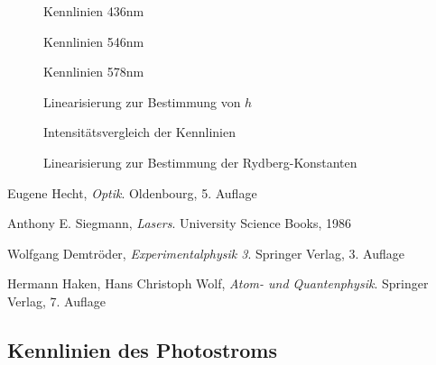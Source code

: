 \documentclass[11pt, a4paper]{article}
\numberwithin{equation}{section}
\begin{document}
\begin{figure}
	\centering
	
	\caption{Kennlinien 436nm}
	\label{fig:kennlinien_436nm}
\end{figure}

\begin{figure}
	\centering
	
	\caption{Kennlinien 546nm}
	\label{fig:kennlinien_546nm}
\end{figure}

\begin{figure}
	\centering
	
	\caption{Kennlinien 578nm}
	\label{fig:kennlinien_578nm}
\end{figure}

\begin{figure}
	\centering
	
	\caption{Linearisierung zur Bestimmung von $h$}
	\label{fig:lin_h}
\end{figure}

\begin{figure}
	\centering
	
	\caption{Intensitätsvergleich der Kennlinien}
	\label{fig:kennlinie_intensitaet}
\end{figure}

\begin{figure}
	\centering
	
	\caption{Linearisierung zur Bestimmung der Rydberg-Konstanten}
	\label{fig:rydberg_balmer}
\end{figure}



\begin{thebibliography}{9}

	Eugene Hecht,
	\emph{Optik}.
	Oldenbourg,
	5. Auflage
	
	Anthony E. Siegmann,
	\emph{Lasers}.
	University Science Books,
	1986
	
	Wolfgang Demtröder,
	\emph{Experimentalphysik 3}.
	Springer Verlag,
	3. Auflage
 
	Hermann Haken, Hans Christoph Wolf,
	\emph{Atom- und Quantenphysik}.
	Springer Verlag,
	7. Auflage
 
\end{thebibliography}

\clearpage


\begin{appendix}
\section{Kennlinien des Photostroms}


\end{appendix}
\end{document}
